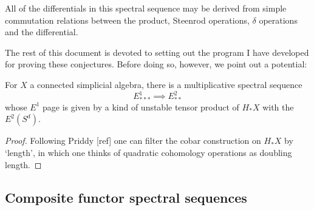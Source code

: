 \documentclass[11pt]{article}
\newcommand{\Sq}{\mathrm{Sq}}
\begin{document}
\begin{conjecture}
All of the differentials in this spectral sequence may be derived from simple commutation relations between the product, Steenrod operations, $\delta$ operations and the differential.
\end{conjecture}
The rest of this document is devoted to setting out the program I have developed for proving these conjectures. Before doing so, however, we point out a potential:
\begin{cor*}
For $X$ a connected simplicial algebra, there is a multiplicative spectral sequence 
\[E^1_{***}\implies E^2_{**}\]
whose $E^1$ page is given by a kind of unstable tensor product of $H_*X$ with the $E^2(S^d)$.
\end{cor*}
\begin{proof}
Following Priddy [ref] one can filter the cobar construction on $H_*X$ by `length', in which one thinks of quadratic cohomology operations as doubling length.
\end{proof}
\subsection*{Composite functor spectral sequences}
\end{document}
